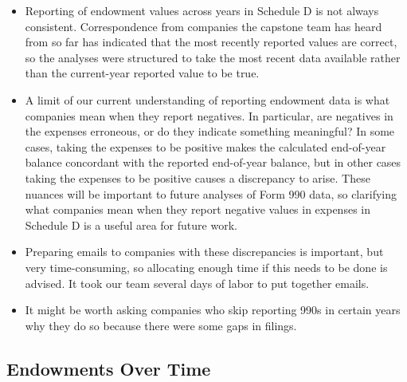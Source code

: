 \documentclass[Dance Data
Project,article,submit,moreauthors,pdftex]{mdpi}
\providecommand{\tightlist}{%
  \setlength{\itemsep}{0pt}\setlength{\parskip}{0pt}}
\begin{document}
\begin{itemize}
\tightlist
\item
  Reporting of endowment values across years in Schedule D is not always
  consistent. Correspondence from companies the capstone team has heard
  from so far has indicated that the most recently reported values are
  correct, so the analyses were structured to take the most recent data
  available rather than the current-year reported value to be true.
\item
  A limit of our current understanding of reporting endowment data is
  what companies mean when they report negatives. In particular, are
  negatives in the expenses erroneous, or do they indicate something
  meaningful? In some cases, taking the expenses to be positive makes
  the calculated end-of-year balance concordant with the reported
  end-of-year balance, but in other cases taking the expenses to be
  positive causes a discrepancy to arise. These nuances will be
  important to future analyses of Form 990 data, so clarifying what
  companies mean when they report negative values in expenses in
  Schedule D is a useful area for future work.
\item
  Preparing emails to companies with these discrepancies is important,
  but very time-consuming, so allocating enough time if this needs to be
  done is advised. It took our team several days of labor to put
  together emails.\\
\item
  It might be worth asking companies who skip reporting 990s in certain
  years why they do so because there were some gaps in filings.
\end{itemize}

\hypertarget{endowments-over-time}{%
\subsection{Endowments Over Time}\label{endowments-over-time}}
\end{document}
